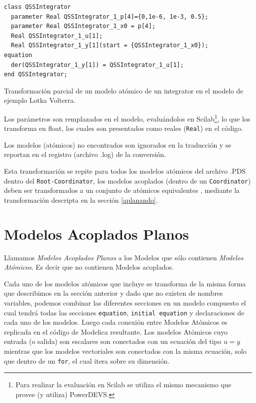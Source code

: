 \begin{listing}[H]
\begin{verbatim}
class QSSIntegrator
  parameter Real QSSIntegrator_1_p[4]={0,1e-6, 1e-3, 0.5};
  parameter Real QSSIntegrator_1_x0 = p[4];
  Real QSSIntegrator_1_u[1];
  Real QSSIntegrator_1_y[1](start = {QSSIntegrator_1_x0});
equation
  der(QSSIntegrator_1_y[1]) = QSSIntegrator_1_u[1];
end QSSIntegrator;
\end{verbatim}
\caption{Transformación parcial de un modelo atómico de un integrator en el modelo de ejemplo Lotka Volterra.}
\end{listing}

        Los parámetros son remplazados en el modelo, evaluándolos en Scilab\footnote{Para realizar la evaluación en Scilab se utiliza el mismo mecanismo que 
        provee (y utiliza) PowerDEVS.}, lo que los transforma en float, los cuales son presentados como reales (\texttt{Real}) en el código.

        Los modelos (atómicos) no encontrados son ignorados en la traducción y se reportan en el registro (archivo .log) de la conversión.

        Esta transformación se repite para todos los modelos atómicos del archivo .PDS dentro del \texttt{Root-Coordinator}, los modelos acoplados 
        (dentro de un \texttt{Coordinator}) deben ser transformados a un conjunto de atómicos equivalentes , mediante la transformación
	descripta en la sección \ref{aplanando}.

\section{Modelos Acoplados Planos}

        Llamamos \emph{Modelos Acoplados Planos} a los Modelos que sólo contienen \emph{Modelos Atómicos}. Es decir que no contienen Modelos acoplados.

        Cada uno de los modelos atómicos que incluye se transforma de la misma forma que describimos en la sección anterior y dado que no existen  
        de nombres variables, podemos combinar las diferentes secciones en un modelo compuesto el cual tendrá todas las secciones \texttt{equation}, 
	\texttt{initial equation} y declaraciones de cada uno de los modelos.
        Luego cada conexión entre Modelos Atómicos es replicada en el código de Modelica resultante. Los modelos Atómicos cuyo entrada (o salida) 
	son escalares son conectados con un ecuación del tipo $u = y$ mientras que los modelos vectoriales son conectados con la misma ecuación, 
	solo que dentro de un \texttt{for}, el cual itera sobre su dimensión.

